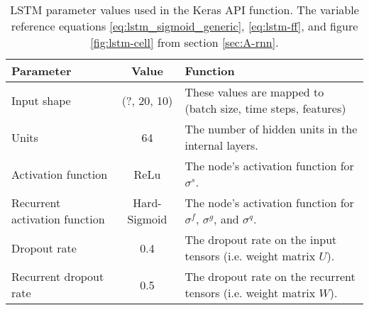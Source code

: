 \begin{table}[!htb]
    \centering
    \caption{\ac{LSTM} parameter values used in the Keras API function. The variable reference equations \ref{eq:lstm_sigmoid_generic}, \ref{eq:lstm-ff}, and figure \ref{fig:lstm-cell} from section \ref{sec:A-rnn}.}
    \begin{tabular}{>{\raggedright}p{} | c | p{}}
        Parameter                       & Value         & Function \\ \hline
        Input shape                     & (?, 20, 10)   & These values are mapped to (batch size, time steps, features) \\ \hline
        Units                           & 64            & The number of hidden units in the internal layers. \\ \hline
        Activation function             & ReLu          & The node's activation function for $\sigma^s$.\\ \hline
        Recurrent activation function   & Hard-Sigmoid  & The node's activation function for $\sigma^f$, $\sigma^g$, and $\sigma^q$.\\ \hline
        Dropout rate                    & 0.4           & The dropout rate on the input tensors (i.e. weight matrix $U$). \\ \hline
        Recurrent dropout rate          & 0.5           & The dropout rate on the recurrent tensors (i.e. weight matrix $W$). \\ \hline
    \end{tabular}
    \label{tab:lstm-parameters}
\end{table}